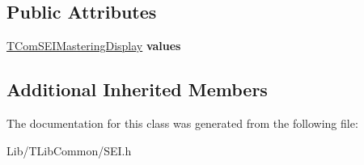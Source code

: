 \subsection*{Public Attributes}
\begin{DoxyCompactItemize}
\item 
\mbox{\label{class_s_e_i_mastering_display_colour_volume_af3cd7c4d57b98335d03414f2f03d111f}} 
\hyperlink{struct_t_com_s_e_i_mastering_display}{T\+Com\+S\+E\+I\+Mastering\+Display} {\bfseries values}
\end{DoxyCompactItemize}
\subsection*{Additional Inherited Members}


The documentation for this class was generated from the following file\+:\begin{DoxyCompactItemize}
\item 
Lib/\+T\+Lib\+Common/S\+E\+I.\+h\end{DoxyCompactItemize}
